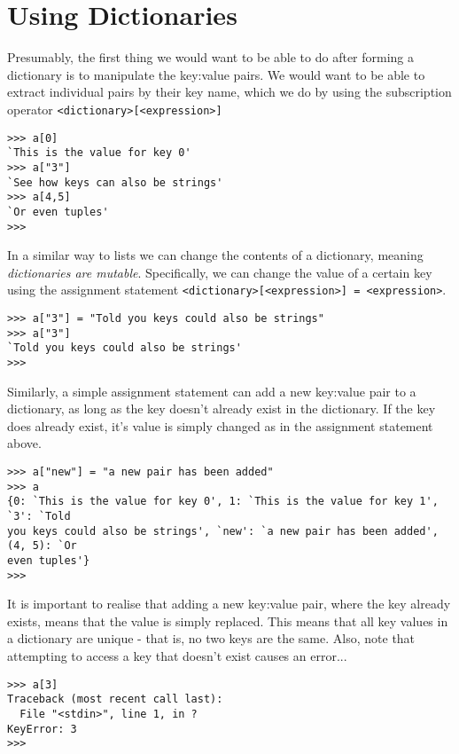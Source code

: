 \section{Using Dictionaries}

Presumably, the first thing we would want to be able to do after   forming a dictionary is to manipulate the key:value pairs. We would   want to be able to extract individual pairs by their key name, which we   do by using the subscription operator   
\texttt{<dictionary>[<expression>]}
\lstset{keywordstyle=\ttfamily}
\begin{lstlisting}
>>> a[0]
`This is the value for key 0'
>>> a["3"]
`See how keys can also be strings'
>>> a[4,5]
`Or even tuples'
>>>
\end{lstlisting}
\lstset{keywordstyle=\textbf}

In a similar way to lists we can change the contents of a   dictionary, meaning \textit{dictionaries are mutable}.   Specifically, we can change the value of a certain key using the   assignment statement 
\texttt{<dictionary>[<expression>] =   <expression>}.
\begin{lstlisting}
>>> a["3"] = "Told you keys could also be strings"
>>> a["3"]
`Told you keys could also be strings'
>>>
\end{lstlisting}

Similarly, a simple assignment statement can add a new key:value   pair to a dictionary, as long as the key doesn't already exist in the   dictionary. If the key does already exist, it's value is simply changed   as in the assignment statement above.
\lstset{keywordstyle=\ttfamily}
\begin{lstlisting}
>>> a["new"] = "a new pair has been added"
>>> a
{0: `This is the value for key 0', 1: `This is the value for key 1', `3': `Told
you keys could also be strings', `new': `a new pair has been added', (4, 5): `Or
even tuples'}
>>>
\end{lstlisting}
\lstset{keywordstyle=\textbf}

It is important to realise that adding a new key:value pair, where the key already exists, means that the value is simply replaced. This means that all key values in a dictionary are unique - that is, no two keys are the same. Also, note   that attempting to access a key that doesn't exist causes an   error...
\lstset{keywordstyle=\ttfamily}
\begin{lstlisting}
>>> a[3]
Traceback (most recent call last):
  File "<stdin>", line 1, in ?
KeyError: 3
>>>
\end{lstlisting}
\lstset{keywordstyle=\textbf}

